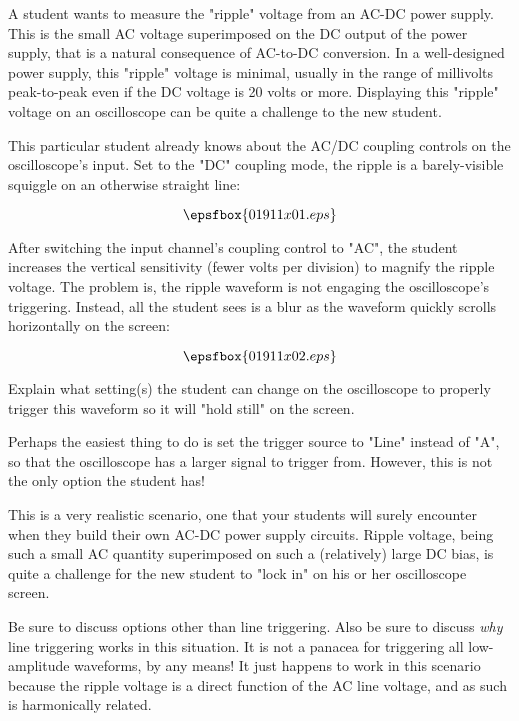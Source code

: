 

A student wants to measure the "ripple" voltage from an AC-DC power supply.  This is the small AC voltage superimposed on the DC output of the power supply, that is a natural consequence of AC-to-DC conversion.  In a well-designed power supply, this "ripple" voltage is minimal, usually in the range of millivolts peak-to-peak even if the DC voltage is 20 volts or more.  Displaying this "ripple" voltage on an oscilloscope can be quite a challenge to the new student.

This particular student already knows about the AC/DC coupling controls on the oscilloscope's input.  Set to the "DC" coupling mode, the ripple is a barely-visible squiggle on an otherwise straight line:

$$\epsfbox{01911x01.eps}$$

After switching the input channel's coupling control to "AC", the student increases the vertical sensitivity (fewer volts per division) to magnify the ripple voltage.  The problem is, the ripple waveform is not engaging the oscilloscope's triggering.  Instead, all the student sees is a blur as the waveform quickly scrolls horizontally on the screen:

$$\epsfbox{01911x02.eps}$$

Explain what setting(s) the student can change on the oscilloscope to properly trigger this waveform so it will "hold still" on the screen.







Perhaps the easiest thing to do is set the trigger source to "Line" instead of "A", so that the oscilloscope has a larger signal to trigger from.  However, this is not the only option the student has!







This is a very realistic scenario, one that your students will surely encounter when they build their own AC-DC power supply circuits.  Ripple voltage, being such a small AC quantity superimposed on such a (relatively) large DC bias, is quite a challenge for the new student to "lock in" on his or her oscilloscope screen.

Be sure to discuss options other than line triggering.  Also be sure to discuss {\it why} line triggering works in this situation.  It is not a panacea for triggering all low-amplitude waveforms, by any means!  It just happens to work in this scenario because the ripple voltage is a direct function of the AC line voltage, and as such is harmonically related.




